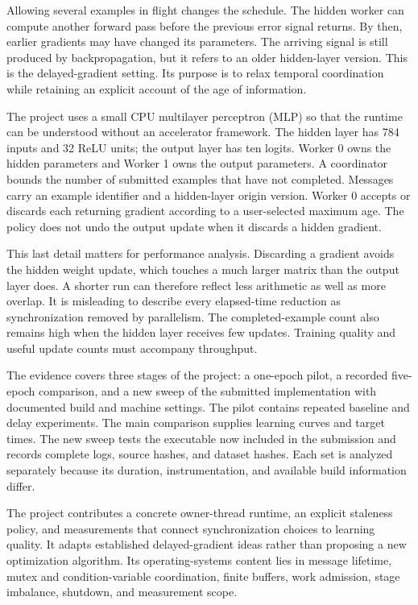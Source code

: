 \documentclass[conference]{IEEEtran}
\begin{document}
Allowing several examples in flight changes the schedule. The hidden worker can compute another forward pass before the previous error signal returns. By then, earlier gradients may have changed its parameters. The arriving signal is still produced by backpropagation, but it refers to an older hidden-layer version. This is the delayed-gradient setting. Its purpose is to relax temporal coordination while retaining an explicit account of the age of information.

The project uses a small CPU multilayer perceptron (MLP) so that the runtime can be understood without an accelerator framework. The hidden layer has 784 inputs and 32 ReLU units; the output layer has ten logits. Worker 0 owns the hidden parameters and Worker 1 owns the output parameters. A coordinator bounds the number of submitted examples that have not completed. Messages carry an example identifier and a hidden-layer origin version. Worker 0 accepts or discards each returning gradient according to a user-selected maximum age. The policy does not undo the output update when it discards a hidden gradient.

This last detail matters for performance analysis. Discarding a gradient avoids the hidden weight update, which touches a much larger matrix than the output layer does. A shorter run can therefore reflect less arithmetic as well as more overlap. It is misleading to describe every elapsed-time reduction as synchronization removed by parallelism. The completed-example count also remains high when the hidden layer receives few updates. Training quality and useful update counts must accompany throughput.

The evidence covers three stages of the project: a one-epoch pilot, a recorded five-epoch comparison, and a new sweep of the submitted implementation with documented build and machine settings. The pilot contains repeated baseline and delay experiments. The main comparison supplies learning curves and target times. The new sweep tests the executable now included in the submission and records complete logs, source hashes, and dataset hashes. Each set is analyzed separately because its duration, instrumentation, and available build information differ.

The project contributes a concrete owner-thread runtime, an explicit staleness policy, and measurements that connect synchronization choices to learning quality. It adapts established delayed-gradient ideas rather than proposing a new optimization algorithm. Its operating-systems content lies in message lifetime, mutex and condition-variable coordination, finite buffers, work admission, stage imbalance, shutdown, and measurement scope.
\end{document}
